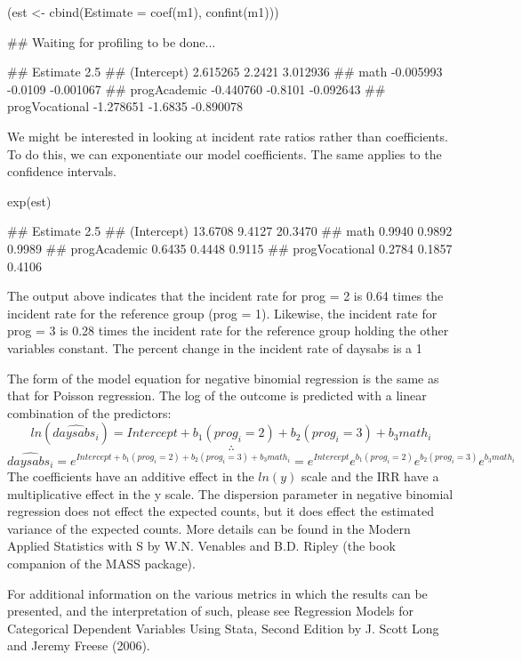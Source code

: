 (est <- cbind(Estimate = coef(m1), confint(m1)))

## Waiting for profiling to be done...

##                 Estimate   2.5 %
## (Intercept)     2.615265  2.2421  3.012936
## math           -0.005993 -0.0109 -0.001067
## progAcademic   -0.440760 -0.8101 -0.092643
## progVocational -1.278651 -1.6835 -0.890078

We might be interested in looking at incident rate ratios rather than coefficients. To do this, we can exponentiate our model coefficients. The same applies to the confidence intervals.



exp(est)

##                Estimate  2.5 %
## (Intercept)     13.6708 9.4127 20.3470
## math             0.9940 0.9892  0.9989
## progAcademic     0.6435 0.4448  0.9115
## progVocational   0.2784 0.1857  0.4106

The output above indicates that the incident rate for prog = 2 is 0.64 times the incident rate for the reference group (prog = 1). Likewise, the incident rate for prog = 3 is 0.28 times the incident rate for the reference group holding the other variables constant. The percent change in the incident rate of daysabs is a 1%

The form of the model equation for negative binomial regression is the same as that for Poisson regression. The log of the outcome is predicted with a linear combination of the predictors:
\[ ln(\widehat{daysabs_i}) = Intercept + b_1(prog_i = 2) + b_2(prog_i = 3) + b_3math_i \] \[ \therefore \] \[ \widehat{daysabs_i} = e^{Intercept + b_1(prog_i = 2) + b_2(prog_i = 3) + b_3math_i} = e^{Intercept}e^{b_1(prog_i = 2)}e^{b_2(prog_i = 3)}e^{b_3math_i} \]
The coefficients have an additive effect in the \(ln(y)\) scale and the IRR have a multiplicative effect in the y scale. The dispersion parameter in negative binomial regression does not effect the expected counts, but it does effect the estimated variance of the expected counts. More details can be found in the Modern Applied Statistics with S by W.N. Venables and B.D. Ripley (the book companion of the MASS package).

For additional information on the various metrics in which the results can be presented, and the interpretation of such, please see Regression Models for Categorical Dependent Variables Using Stata, Second Edition by J. Scott Long and Jeremy Freese (2006).

